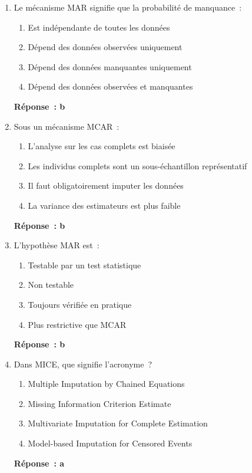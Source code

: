 \documentclass[a4paper,11pt]{article}
\theoremstyle{definition}
\theoremstyle{remark}
\begin{document}
\begin{enumerate}

  \item Le mécanisme MAR signifie que la probabilité de manquance~:
    \begin{enumerate}
      \item Est indépendante de toutes les données
      \item Dépend des données observées uniquement
      \item Dépend des données manquantes uniquement
      \item Dépend des données observées et manquantes
    \end{enumerate}
    \textbf{Réponse~: b}

  \item Sous un mécanisme MCAR~:
    \begin{enumerate}
      \item L'analyse sur les cas complets est biaisée
      \item Les individus complets sont un sous-échantillon
        représentatif
      \item Il faut obligatoirement imputer les données
      \item La variance des estimateurs est plus faible
    \end{enumerate}
    \textbf{Réponse~: b}

  \item L'hypothèse MAR est~:
    \begin{enumerate}
      \item Testable par un test statistique
      \item Non testable
      \item Toujours vérifiée en pratique
      \item Plus restrictive que MCAR
    \end{enumerate}
    \textbf{Réponse~: b}

  \item Dans MICE, que signifie l'acronyme~?
    \begin{enumerate}
      \item Multiple Imputation by Chained Equations
      \item Missing Information Criterion Estimate
      \item Multivariate Imputation for Complete Estimation
      \item Model-based Imputation for Censored Events
    \end{enumerate}
    \textbf{Réponse~: a}


\end{enumerate}
\end{document}
